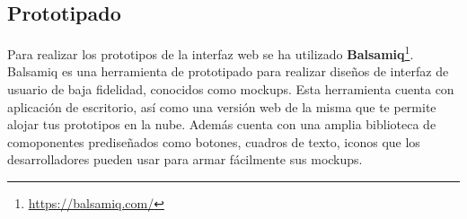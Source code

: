 \subsection{Prototipado}
Para realizar los prototipos de la interfaz web se ha utilizado \textbf{Balsamiq}\footnote{\url{https://balsamiq.com/}}. Balsamiq es una herramienta de prototipado para realizar diseños de interfaz de usuario de baja fidelidad, conocidos como \gls{mockups}. Esta herramienta cuenta con aplicación de escritorio, así como una versión web de la misma que te permite alojar tus prototipos en la nube. Además cuenta con una amplia biblioteca de comoponentes prediseñados como botones, cuadros de texto, iconos que los desarrolladores pueden usar para armar fácilmente sus \gls{mockups}.